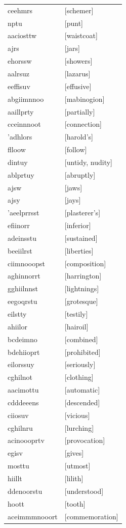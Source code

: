 \documentclass{article}
\begin{document}
\begin{tabular}{ll}
ceehmrs & [schemer] \\
nptu & [punt] \\
aaciosttw & [waistcoat] \\
ajrs & [jars] \\
ehorssw & [showers] \\
aalrsuz & [lazarus] \\
eeffisuv & [effusive] \\
abgiimnnoo & [mabinogion] \\
aaillprty & [partially] \\
cceinnnoot & [connection] \\
'adhlors & [harold's] \\
flloow & [follow] \\
dintuy & [untidy, nudity] \\
ablprtuy & [abruptly] \\
ajsw & [jaws] \\
ajsy & [jays] \\
'aeelprrsst & [plasterer's] \\
efiinorr & [inferior] \\
adeinsstu & [sustained] \\
beeiilrst & [liberties] \\
ciimnooopst & [composition] \\
aghinnorrt & [harrington] \\
gghiilnnst & [lightnings] \\
eegoqrstu & [grotesque] \\
eilstty & [testily] \\
ahiilor & [hairoil] \\
bcdeimno & [combined] \\
bdehiioprt & [prohibited] \\
eilorssuy & [seriously] \\
cghilnot & [clothing] \\
aacimottu & [automatic] \\
cdddeeens & [descended] \\
ciiosuv & [vicious] \\
cghilnru & [lurching] \\
acinoooprtv & [provocation] \\
egisv & [gives] \\
mosttu & [utmost] \\
hiillt & [lilith] \\
ddenoorstu & [understood] \\
hoott & [tooth] \\
aceimmmnooort & [commemoration] \\

\end{tabular}
\end{document}
